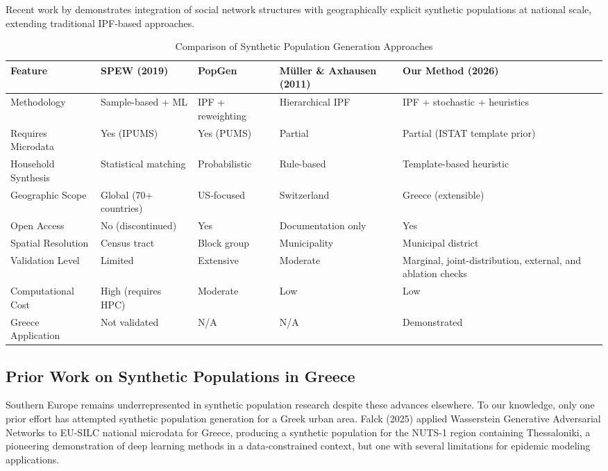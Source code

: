 \documentclass{article}
\begin{document}
Recent work by \citet{Jiang2024} demonstrates integration of social network structures with geographically explicit synthetic populations at national scale, extending traditional IPF-based approaches.

\begin{table}[htbp]
\centering
\small
\setlength{\tabcolsep}{4pt}
\renewcommand{\arraystretch}{1.2}
\begin{tabularx}{\textwidth}{@{}l L L L L@{}}
\toprule
        Feature & SPEW (2019) & PopGen & Müller \& Axhausen (2011) & Our Method (2026) \\ \midrule
        Methodology & Sample-based + ML & IPF + reweighting & Hierarchical IPF & IPF + stochastic + heuristics \\
        Requires Microdata & Yes (IPUMS) & Yes (PUMS) & Partial & Partial (ISTAT template prior) \\
        Household Synthesis & Statistical matching & Probabilistic & Rule-based & Template-based heuristic \\
        Geographic Scope & Global (70+ countries) & US-focused & Switzerland & Greece (extensible) \\
        Open Access & No (discontinued) & Yes & Documentation only & Yes \\
        Spatial Resolution & Census tract & Block group & Municipality & Municipal district \\
        Validation Level & Limited & Extensive & Moderate & Marginal, joint-distribution, external, and ablation checks \\
        Computational Cost & High (requires HPC) & Moderate & Low & Low \\
        Greece Application & Not validated & N/A & N/A & Demonstrated \\ \bottomrule
\end{tabularx}
    \caption{Comparison of Synthetic Population Generation Approaches}
\end{table}

\subsection{Prior Work on Synthetic Populations in Greece}\label{prior-work-on-synthetic-populations-in-greece}

Southern Europe remains underrepresented in synthetic population research despite these advances elsewhere. To our knowledge, only one prior effort has attempted synthetic population generation for a Greek urban area. Falck (2025) applied Wasserstein Generative Adversarial Networks to EU-SILC national microdata for Greece, producing a synthetic population for the NUTS-1 region containing Thessaloniki, a pioneering demonstration of deep learning methods in a data-constrained context, but one with several limitations for epidemic modeling applications.
\end{document}
